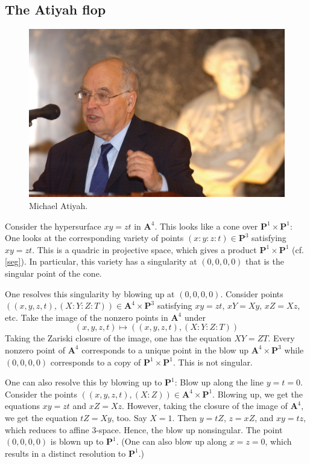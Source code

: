 \documentclass [11 pt, oneside] {article}
\begin{document}
\subsection{The Atiyah flop}
\begin{figure}
\begin{center}
\includegraphics[scale=0.15]{images/atiyah}
\caption{Michael Atiyah.}
\end{center}
\end{figure}
Consider the hypersurface $xy=zt$ in $\mathbf{A}^4$. This looks like a cone over $\mathbf{P}^1\times \mathbf{P}^1$: One looks at the corresponding variety of points $(x:y:z:t)\in \mathbf{P}^3$ satisfying $xy=zt$. This is a quadric in projective space, which gives a product $\mathbf{P}^1\times \mathbf{P}^1$ (cf. \cref{seg}). In particular, this variety has a singularity at $(0,0,0,0)$ that is the singular point of the cone.

One resolves this singularity by blowing up at $(0,0,0,0)$. Consider points $((x,y,z,t),  (X:Y:Z:T)) \in \mathbf{A}^4\times \mathbf{P}^3$ satisfying $xy=zt$, $xY=Xy$, $xZ = Xz$, etc. Take the image of the nonzero points in $\mathbf{A}^4$ under
\[
	(x,y,z,t)\longmapsto  ((x,y,z,t),  (X:Y:Z:T))
	\]
	Taking the Zariski closure of the image, one has the equation $XY=ZT$. Every nonzero point of $\mathbf{A}^4$ corresponds to a unique point in the blow up $\mathbf{A}^4\times \mathbf{P}^3$ while $(0,0,0,0)$ corresponds to a copy of $\mathbf{P}^1\times \mathbf{P}^1$. This is not singular.

	One can also resolve this by blowing up to $\mathbf{P}^1$: Blow up along the line $y=t=0$. Consider the points $((x,y,z,t),  (X:Z)) \in \mathbf{A}^4\times \mathbf{P}^1$. Blowing up, we get the equations $xy=zt$ and $xZ=Xz$. However, taking the closure of the image of $\mathbf{A}^4$, we get the equation $tZ = Xy$, too. Say $X=1$. Then $y=tZ$, $z=xZ$, and $xy=tz$, which reduces to affine $3$-space. Hence, the blow up nonsingular. The point $(0,0,0,0)$ is blown up to $\mathbf{P}^1$. (One can also blow up along $x=z=0$, which results in a distinct resolution to $\mathbf{P}^1$.)
\end{document}

